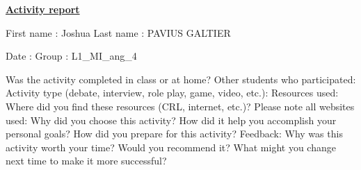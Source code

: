 \documentclass[]{article}
\begin{document}
  \begin{center}
    \underline{\textbf{Activity report}}
  \end{center}
  \vspace*{20 pt}

First name : Joshua
  \hspace*{120pt}
Last name : PAVIUS GALTIER
  \newline

Date :
  \hspace*{170pt}
Group : L1\_MI\_ang\_4
  \newline

  Was the activity completed in class or at home? \newline
  \newline
  \indent Other students who participated: \newline
  \newline\newline\newline\newline
  Activity type (debate, interview, role play, game, video, etc.):
  \newline\newline\newline\newline
  Resources used: Where did you find these resources (CRL, internet, etc.)? Please note all websites used: 
  \newline\newline\newline\newline
  Why did you choose this activity? How did it help you accomplish your personal goals?
  \newline\newline\newline\newline
  How did you prepare for this activity? 
  \newline\newline\newline\newline
  Feedback: Why was this activity worth your time? Would you recommend it? What might you change next time to make it more successful? 
  \newline\newline
\end{document}
